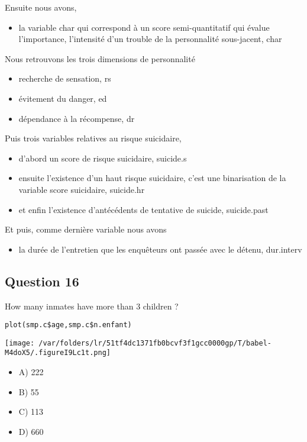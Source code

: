 \documentclass[11pt]{article}
\begin{document}
Ensuite nous avons,
\begin{itemize}
\item la variable char qui correspond à un score semi-quantitatif qui évalue
l'importance, l'intensité d'un trouble de la personnalité sous-jacent, char
\end{itemize}

Nous retrouvons les trois dimensions de personnalité
\begin{itemize}
\item recherche de sensation, rs

\item évitement du danger, ed

\item dépendance à la récompense, dr
\end{itemize}

Puis trois variables relatives au risque suicidaire,
\begin{itemize}
\item d'abord un score de risque suicidaire, suicide.s

\item ensuite l'existence d'un haut risque suicidaire, c'est une binarisation de la variable score suicidaire, suicide.hr

\item et enfin l'existence d'antécédents de tentative de suicide, suicide.past
\end{itemize}

Et puis, comme dernière variable nous avons
\begin{itemize}
\item la durée de l'entretien que les enquêteurs ont passée avec le détenu, dur.interv
\end{itemize}

\subsection*{Question 16}
\label{sec:orgdf0ff8f}
How many inmates have more than 3 children ?
\begin{verbatim}
plot(smp.c$age,smp.c$n.enfant)
\end{verbatim}

\begin{center}
\texttt{[image: /var/folders/lr/51tf4dc1371fb0bcvf3f1gcc0000gp/T/babel-M4doX5/.figureI9Lc1t.png]}
\end{center}

\begin{itemize}
\item A) 222

\item B) 55

\item C) 113

\item D) 660
\end{itemize}
\end{document}
